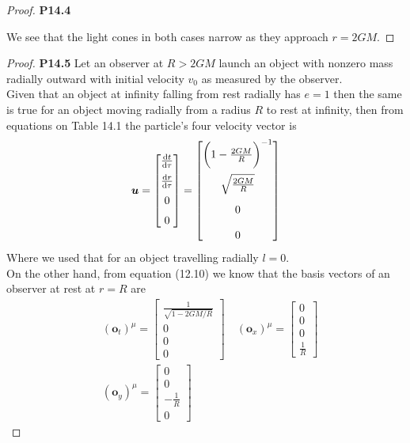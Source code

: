 \documentclass[11pt]{article}
\theoremstyle{definition}
\begin{document}
\begin{proof}{\textbf{P14.4}}
\begin{center}
\end{center}
We see that the light cones in both cases narrow as they approach $r = 2GM$.
\end{proof}

\cleardoublepage
\begin{proof}{\textbf{P14.5}}
Let an observer at $R > 2GM$ launch an object with nonzero mass radially
outward with initial velocity $v_0$ as measured by the observer.
\\
Given that an object at infinity falling from rest radially has $e = 1$ then 
the same is true for an object moving radially from a radius $R$ to rest at
infinity, then from equations on Table 14.1 the particle's four velocity vector
is
\begin{align*}
    \bm{u} = \begin{bmatrix}
        \dv{t}{\tau} \\[6pt] \dv{r}{\tau} \\[6pt] 0 \\[6pt] 0
    \end{bmatrix}
    = \begin{bmatrix}
        \bigg(1 - \frac{2GM}{R}\bigg)^{-1} \\[11pt]
        \sqrt{\frac{2GM}{R}}\\[11pt] 0 \\[11pt] 0
    \end{bmatrix}
\end{align*}
Where we used that for an object travelling radially $l = 0$.
\\
On the other hand, from equation (12.10) we know that the basis vectors
of an observer at rest at $r = R$ are
\begin{align*}
    &(\bm{o}_t)^\mu = \begin{bmatrix}
        \frac{1}{\sqrt{1 - 2GM/R}}\\ 0\\ 0 \\ 0
    \end{bmatrix}
    \quad (\bm{o}_x)^\mu = \begin{bmatrix}
        0\\ 0\\ 0 \\ \frac{1}{R}
    \end{bmatrix}\\
    &(\bm{o}_y)^\mu = \begin{bmatrix}
        0\\ 0\\ -\frac{1}{R} \\ 0

\end{bmatrix}
\end{align*}
\end{proof}
\end{document}
